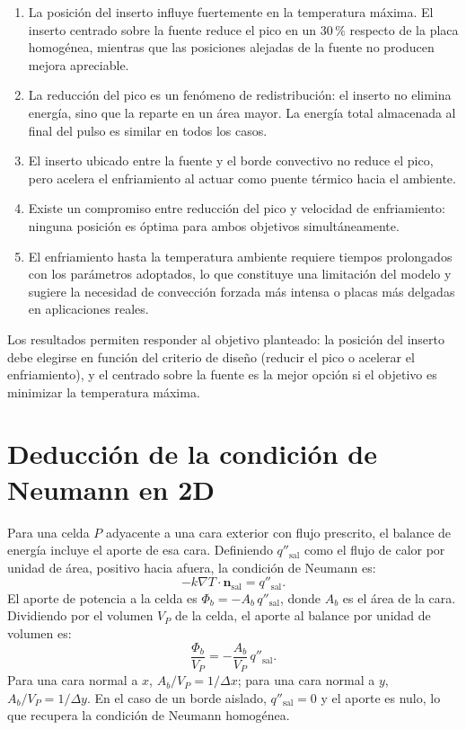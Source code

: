 \documentclass[11pt,a4paper]{article}
\begin{document}
\begin{enumerate}
\item La posición del inserto influye fuertemente en la temperatura máxima. El inserto centrado sobre la fuente reduce el pico en un $30\,\%$ respecto de la placa homogénea, mientras que las posiciones alejadas de la fuente no producen mejora apreciable.
\item La reducción del pico es un fenómeno de redistribución: el inserto no elimina energía, sino que la reparte en un área mayor. La energía total almacenada al final del pulso es similar en todos los casos.
\item El inserto ubicado entre la fuente y el borde convectivo no reduce el pico, pero acelera el enfriamiento al actuar como puente térmico hacia el ambiente.
\item Existe un compromiso entre reducción del pico y velocidad de enfriamiento: ninguna posición es óptima para ambos objetivos simultáneamente.
\item El enfriamiento hasta la temperatura ambiente requiere tiempos prolongados con los parámetros adoptados, lo que constituye una limitación del modelo y sugiere la necesidad de convección forzada más intensa o placas más delgadas en aplicaciones reales.
\end{enumerate}

Los resultados permiten responder al objetivo planteado: la posición del inserto debe elegirse en función del criterio de diseño (reducir el pico o acelerar el enfriamiento), y el centrado sobre la fuente es la mejor opción si el objetivo es minimizar la temperatura máxima.



\appendix

\section{Deducción de la condición de Neumann en 2D}

Para una celda $P$ adyacente a una cara exterior con flujo prescrito, el balance de energía incluye el aporte de esa cara. Definiendo $q''_{\text{sal}}$ como el flujo de calor por unidad de área, positivo hacia afuera, la condición de Neumann es:
\begin{equation}
-k \nabla T \cdot \mathbf{n}_{\text{sal}} = q''_{\text{sal}}.
\end{equation}
El aporte de potencia a la celda es $\Phi_b = -A_b\,q''_{\text{sal}}$, donde $A_b$ es el área de la cara. Dividiendo por el volumen $V_P$ de la celda, el aporte al balance por unidad de volumen es:
\begin{equation}
\frac{\Phi_b}{V_P} = -\frac{A_b}{V_P}\,q''_{\text{sal}}.
\end{equation}
Para una cara normal a $x$, $A_b/V_P = 1/\Delta x$; para una cara normal a $y$, $A_b/V_P = 1/\Delta y$. En el caso de un borde aislado, $q''_{\text{sal}}=0$ y el aporte es nulo, lo que recupera la condición de Neumann homogénea.
\end{document}
